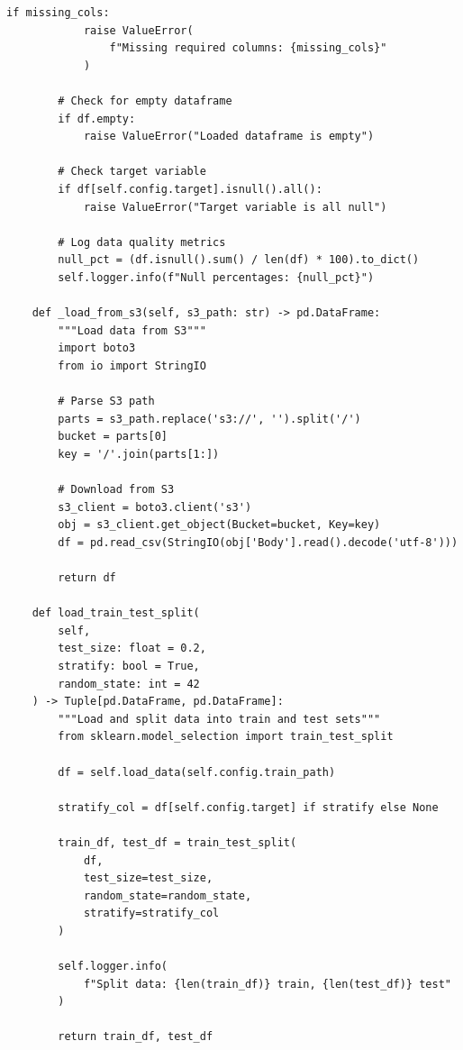 \begin{lstlisting}[style=python, caption=Production ML Pipeline - Data Module]
        if missing_cols:
            raise ValueError(
                f"Missing required columns: {missing_cols}"
            )

        # Check for empty dataframe
        if df.empty:
            raise ValueError("Loaded dataframe is empty")

        # Check target variable
        if df[self.config.target].isnull().all():
            raise ValueError("Target variable is all null")

        # Log data quality metrics
        null_pct = (df.isnull().sum() / len(df) * 100).to_dict()
        self.logger.info(f"Null percentages: {null_pct}")

    def _load_from_s3(self, s3_path: str) -> pd.DataFrame:
        """Load data from S3"""
        import boto3
        from io import StringIO

        # Parse S3 path
        parts = s3_path.replace('s3://', '').split('/')
        bucket = parts[0]
        key = '/'.join(parts[1:])

        # Download from S3
        s3_client = boto3.client('s3')
        obj = s3_client.get_object(Bucket=bucket, Key=key)
        df = pd.read_csv(StringIO(obj['Body'].read().decode('utf-8')))

        return df

    def load_train_test_split(
        self,
        test_size: float = 0.2,
        stratify: bool = True,
        random_state: int = 42
    ) -> Tuple[pd.DataFrame, pd.DataFrame]:
        """Load and split data into train and test sets"""
        from sklearn.model_selection import train_test_split

        df = self.load_data(self.config.train_path)

        stratify_col = df[self.config.target] if stratify else None

        train_df, test_df = train_test_split(
            df,
            test_size=test_size,
            random_state=random_state,
            stratify=stratify_col
        )

        self.logger.info(
            f"Split data: {len(train_df)} train, {len(test_df)} test"
        )

        return train_df, test_df
\end{lstlisting}

